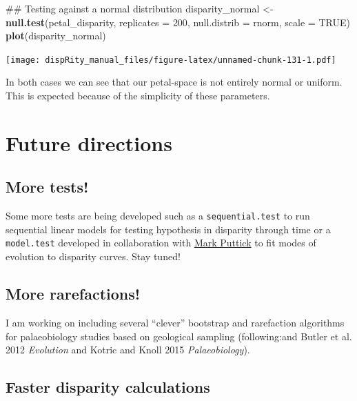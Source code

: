 \documentclass[]{book}
\newenvironment{Shaded}{\begin{snugshade}}{\end{snugshade}}
\newcommand{\KeywordTok}[1]{\textcolor[rgb]{0.13,0.29,0.53}{\textbf{#1}}}
\newcommand{\DataTypeTok}[1]{\textcolor[rgb]{0.13,0.29,0.53}{#1}}
\newcommand{\DecValTok}[1]{\textcolor[rgb]{0.00,0.00,0.81}{#1}}
\newcommand{\StringTok}[1]{\textcolor[rgb]{0.31,0.60,0.02}{#1}}
\newcommand{\OtherTok}[1]{\textcolor[rgb]{0.56,0.35,0.01}{#1}}
\newcommand{\NormalTok}[1]{#1}
\theoremstyle{definition}
\theoremstyle{definition}
\theoremstyle{definition}
\theoremstyle{remark}
\begin{document}
\begin{Shaded}
\begin{Highlighting}[]
\NormalTok{## Testing against a normal distribution}
\NormalTok{disparity_normal <-}\StringTok{ }\KeywordTok{null.test}\NormalTok{(petal_disparity, }\DataTypeTok{replicates =} \DecValTok{200}\NormalTok{,}
    \DataTypeTok{null.distrib =}\NormalTok{ rnorm, }\DataTypeTok{scale =} \OtherTok{TRUE}\NormalTok{)}
\KeywordTok{plot}\NormalTok{(disparity_normal)}
\end{Highlighting}
\end{Shaded}

\texttt{[image: dispRity\_manual\_files/figure-latex/unnamed-chunk-131-1.pdf]}

In both cases we can see that our petal-space is not entirely normal or
uniform. This is expected because of the simplicity of these parameters.

\chapter{Future directions}\label{future-directions}

\section{More tests!}\label{more-tests}

Some more tests are being developed such as a \texttt{sequential.test}
to run sequential linear models for testing hypothesis in disparity
through time or a \texttt{model.test} developed in collaboration with
\href{https://puttickbiology.wordpress.com/}{Mark Puttick} to fit modes
of evolution to disparity curves. Stay tuned!

\section{More rarefactions!}\label{more-rarefactions}

I am working on including several ``clever'' bootstrap and rarefaction
algorithms for palaeobiology studies based on geological sampling
(following:and Butler et al. 2012 \emph{Evolution} and Kotric and Knoll
2015 \emph{Palaeobiology}).

\section{Faster disparity
calculations}\label{faster-disparity-calculations}
\end{document}
